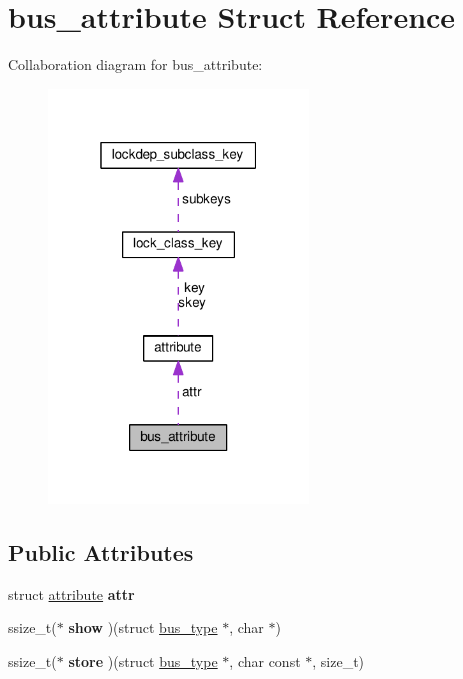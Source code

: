 \hypertarget{structbus__attribute}{}\section{bus\+\_\+attribute Struct Reference}
\label{structbus__attribute}


Collaboration diagram for bus\+\_\+attribute\+:
\nopagebreak
\begin{figure}[H]
\begin{center}
\leavevmode
\includegraphics[width=196pt]{structbus__attribute__coll__graph}
\end{center}
\end{figure}
\subsection*{Public Attributes}
\begin{DoxyCompactItemize}
\item 
\hypertarget{structbus__attribute_a48a450ccc734ccfdb13c4c38beef7002}{}struct \hyperlink{structattribute}{attribute} {\bfseries attr}\label{structbus__attribute_a48a450ccc734ccfdb13c4c38beef7002}

\item 
\hypertarget{structbus__attribute_ab0f0b4941d0b3d3c2f9c03867f3eb8dc}{}ssize\+\_\+t($\ast$ {\bfseries show} )(struct \hyperlink{structbus__type}{bus\+\_\+type} $\ast$, char $\ast$)\label{structbus__attribute_ab0f0b4941d0b3d3c2f9c03867f3eb8dc}

\item 
\hypertarget{structbus__attribute_ab157a5bf8a428499a9a13f8b7836b202}{}ssize\+\_\+t($\ast$ {\bfseries store} )(struct \hyperlink{structbus__type}{bus\+\_\+type} $\ast$, char const $\ast$, size\+\_\+t)\label{structbus__attribute_ab157a5bf8a428499a9a13f8b7836b202}

\end{DoxyCompactItemize}


